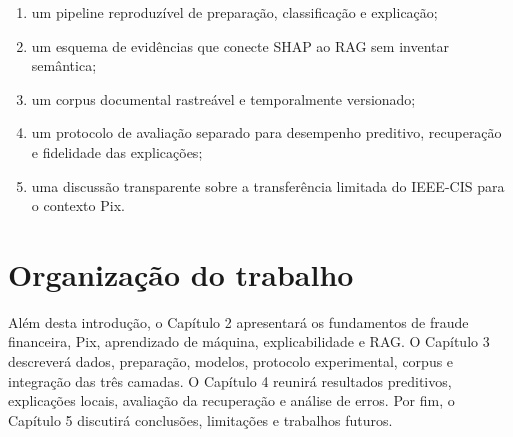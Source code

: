 \begin{enumerate}
  \item um pipeline reproduzível de preparação, classificação e explicação;
  \item um esquema de evidências que conecte SHAP ao RAG sem inventar semântica;
  \item um corpus documental rastreável e temporalmente versionado;
  \item um protocolo de avaliação separado para desempenho preditivo, recuperação e fidelidade das explicações;
  \item uma discussão transparente sobre a transferência limitada do IEEE-CIS para o contexto Pix.
\end{enumerate}

\section{Organização do trabalho}

Além desta introdução, o Capítulo 2 apresentará os fundamentos de fraude financeira, Pix, aprendizado de máquina, explicabilidade e RAG. O Capítulo 3 descreverá dados, preparação, modelos, protocolo experimental, corpus e integração das três camadas. O Capítulo 4 reunirá resultados preditivos, explicações locais, avaliação da recuperação e análise de erros. Por fim, o Capítulo 5 discutirá conclusões, limitações e trabalhos futuros.

